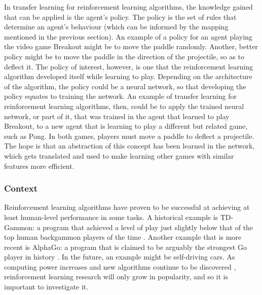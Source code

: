 \documentclass[12pt,a4paper]{article}
\begin{document}
In transfer learning for reinforcement learning algorithms, the knowledge gained that can be applied is the agent's policy. The policy is the set of rules that determine an agent's behaviour (which can be informed by the mapping mentioned in the previous section). An example of a policy for an agent playing the video game Breakout might be to move the paddle randomly. Another, better policy might be to move the paddle in the direction of the projectile, so as to deflect it. The policy of interest, however, is one that the reinforcement learning algorithm developed itself while learning to play. Depending on the architecture of the algorithm, the policy could be a neural network, so that developing the policy equates to training the network. An example of transfer learning for reinforcement learning algorithms, then, could be to apply the trained neural network, or part of it, that was trained in the agent that learned to play Breakout, to a new agent that is learning to play a different but related game, such as Pong. In both games, players must move a paddle to deflect a projectile. The hope is that an abstraction of this concept has been learned in the network, which gets translated and used to make learning other games with similar features more efficient.

\subsubsection{Context}
Reinforcement learning algorithms have proven to be successful at achieving at least human-level performance in some tasks. A historical example is TD-Gammon: a program that achieved a level of play just slightly below that of the top human backgammon players of the time \cite{}. Another example that is more recent is AlphaGo: a program that is claimed to be arguably the strongest Go player in history \cite{}. In the future, an example might be self-driving cars. As computing power increases and new algorithms continue to be discovered \cite{}, reinforcement learning research will only grow in popularity, and so it is important to investigate it.
\end{document}

